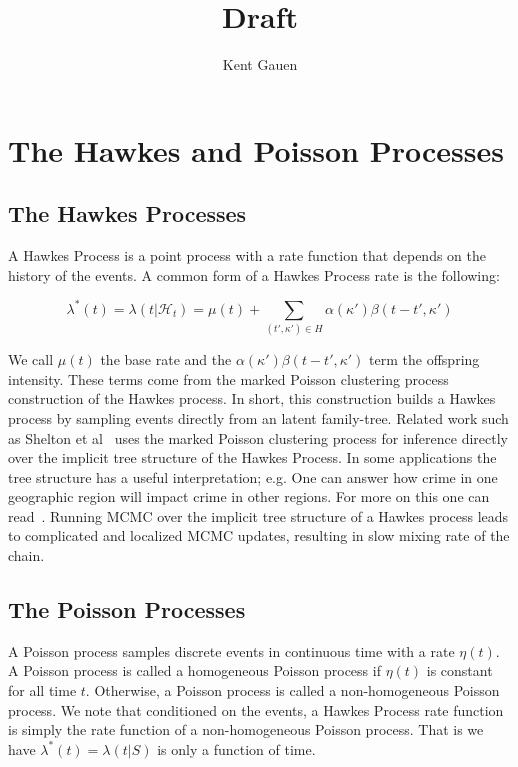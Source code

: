 \documentclass[11pt]{article}
\author{Kent Gauen}
\title{Draft}
\begin{document}
\maketitle

\section{The Hawkes and Poisson Processes}

\subsection{The Hawkes Processes}

\noindent A Hawkes Process is a point process with a rate function that depends on the history of the events. A common form of a Hawkes Process rate is the following:

\[
  \lambda^*(t)
  =
  \lambda(t|\mathcal{H}_t)
  =
  \mu(t)
  +
  \sum_{(t',\kappa')\in H}\alpha(\kappa')\beta(t-t',\kappa')
\]

\noindent We call $\mu(t)$ the base rate and the $\alpha(\kappa')\beta(t-t',\kappa')$ term the offspring intensity. These terms come from the marked Poisson clustering process construction of the Hawkes process. In short, this construction builds a Hawkes process by sampling events directly from an latent family-tree. Related work such as Shelton et al~\cite{AAAI1816985} uses the marked Poisson clustering process for inference directly over the implicit tree structure of the Hawkes Process. In some applications the tree structure has a useful interpretation; e.g. One can answer how crime in one geographic region will impact crime in other regions. For more on this one can read~\cite{Rasmussen2013}. Running MCMC over the implicit tree structure of a Hawkes process leads to complicated and localized MCMC updates, resulting in slow mixing rate of the chain.

\subsection{The Poisson Processes}

\noindent A Poisson process samples discrete events in continuous time with a rate $\eta(t)$. A Poisson process is called a homogeneous Poisson process if $\eta(t)$ is constant for all time $t$. Otherwise, a Poisson process is called a non-homogeneous Poisson process. We note that conditioned on the events, a Hawkes Process rate function is simply the rate function of a non-homogeneous Poisson process. That is we have $\lambda^*(t) = \lambda(t | S)$ is only a function of time.
\end{document}
